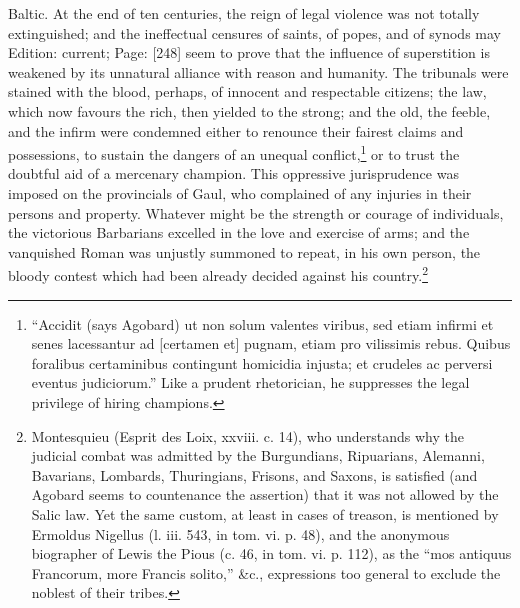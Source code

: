 Baltic. At the end of ten centuries, the reign of legal violence was not totally extinguished; and the ineffectual censures of saints, of popes, and of synods may Edition: current; Page: [248] seem to prove that the influence of superstition is weakened by its unnatural alliance with reason and humanity. The tribunals were stained with the blood, perhaps, of innocent and respectable citizens; the law, which now favours the rich, then yielded to the strong; and the old, the feeble, and the infirm were condemned either to renounce their fairest claims and possessions, to sustain the dangers of an unequal conflict,\footnote{\texthebrew{“}Accidit (says Agobard) ut non solum valentes viribus, sed etiam infirmi et senes lacessantur ad [certamen et] pugnam, etiam pro vilissimis rebus. Quibus foralibus certaminibus contingunt homicidia injusta; et crudeles ac perversi eventus judiciorum.\texthebrew{}” Like a prudent rhetorician, he suppresses the legal privilege of hiring champions.} or to trust the doubtful aid of a mercenary champion. This oppressive jurisprudence was imposed on the provincials of Gaul, who complained of any injuries in their persons and property. Whatever might be the strength or courage of individuals, the victorious Barbarians excelled in the love and exercise of arms; and the vanquished Roman was unjustly summoned to repeat, in his own person, the bloody contest which had been already decided against his country.\footnote{Montesquieu (Esprit des Loix, xxviii. c. 14), who understands why the judicial combat was admitted by the Burgundians, Ripuarians, Alemanni, Bavarians, Lombards, Thuringians, Frisons, and Saxons, is satisfied (and Agobard seems to countenance the assertion) that it was not allowed by the Salic law. Yet the same custom, at least in cases of treason, is mentioned by Ermoldus Nigellus (l. iii. 543, in tom. vi. p. 48), and the anonymous biographer of Lewis the Pious (c. 46, in tom. vi. p. 112), as the \texthebrew{“}mos antiquus Francorum, more Francis solito,\texthebrew{}” \&c., expressions too general to exclude the noblest of their tribes.}

